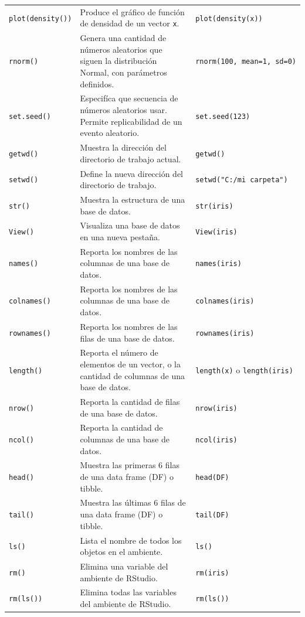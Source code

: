 \documentclass[
]{article}
\theoremstyle{definition}
\theoremstyle{definition}
\theoremstyle{definition}
\theoremstyle{definition}
\theoremstyle{remark}
\begin{document}
\begin{longtable}[]{@{}lll@{}}
\texttt{plot(density())} & Produce el gráfico de función de densidad de un vector \texttt{x}. & \texttt{plot(density(x))} \\
\texttt{rnorm()} & Genera una cantidad de números aleatorios que siguen la distribución Normal, con parámetros definidos. & \texttt{rnorm(100,\ mean=1,\ sd=0)} \\
\texttt{set.seed()} & Especifíca que secuencia de números aleatorios usar. Permite replicabilidad de un evento aleatorio. & \texttt{set.seed(123)} \\
\texttt{getwd()} & Muestra la dirección del directorio de trabajo actual. & \texttt{getwd()} \\
\texttt{setwd()} & Define la nueva dirección del directorio de trabajo. & \texttt{setwd("C:/mi\ carpeta")} \\
\texttt{str()} & Muestra la estructura de una base de datos. & \texttt{str(iris)} \\
\texttt{View()} & Visualiza una base de datos en una nueva pestaña. & \texttt{View(iris)} \\
\texttt{names()} & Reporta los nombres de las columnas de una base de datos. & \texttt{names(iris)} \\
\texttt{colnames()} & Reporta los nombres de las columnas de una base de datos. & \texttt{colnames(iris)} \\
\texttt{rownames()} & Reporta los nombres de las filas de una base de datos. & \texttt{rownames(iris)} \\
\texttt{length()} & Reporta el número de elementos de un vector, o la cantidad de columnas de una base de datos. & \texttt{length(x)} o \texttt{length(iris)} \\
\texttt{nrow()} & Reporta la cantidad de filas de una base de datos. & \texttt{nrow(iris)} \\
\texttt{ncol()} & Reporta la cantidad de columnas de una base de datos. & \texttt{ncol(iris)} \\
\texttt{head()} & Muestra las primeras 6 filas de una data frame (DF) o tibble. & \texttt{head(DF)} \\
\texttt{tail()} & Muestra las últimas 6 filas de una data frame (DF) o tibble. & \texttt{tail(DF)} \\
\texttt{ls()} & Lista el nombre de todos los objetos en el ambiente. & \texttt{ls()} \\
\texttt{rm()} & Elimina una variable del ambiente de RStudio. & \texttt{rm(iris)} \\
\texttt{rm(ls())} & Elimina todas las variables del ambiente de RStudio. & \texttt{rm(ls())} \\

\end{longtable}
\end{document}
